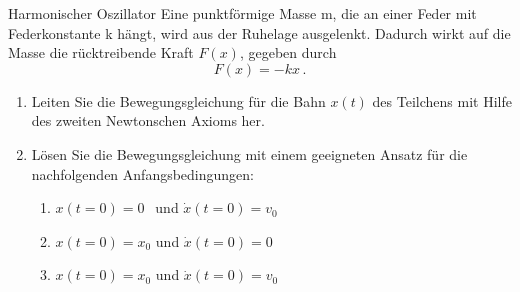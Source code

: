 \setcounter{punkte}{4}
\begin{aufgabe}{Harmonischer Oszillator}
Eine punktförmige Masse m, die an einer Feder mit Federkonstante k
hängt, wird aus der Ruhelage ausgelenkt.
Dadurch wirkt auf die Masse die rücktreibende
Kraft $F(x)$, gegeben durch
\begin{equation}
  F(x) = -kx \, .
\end{equation}
\renewcommand{\labelenumi}{\alph{enumi})}
\renewcommand{\labelenumii}{(\roman{enumii})}
\begin{enumerate}
    \item Leiten Sie die Bewegungsgleichung für die Bahn $x(t)$ des Teilchens mit Hilfe des
    zweiten Newtonschen Axioms her.
    \item Lösen Sie die Bewegungsgleichung mit einem geeigneten Ansatz für die nachfolgenden
    Anfangsbedingungen:
    \begin{enumerate}
      \item $x(t=0) = 0$ $\: \:$und $\dot{x}(t=0) = v_0$
      \item $x(t=0) = x_0$ und $\dot{x}(t=0) = 0$
      \item $x(t=0) = x_0$ und $\dot{x}(t=0) = v_0$
    \end{enumerate}
\end{enumerate}
\end{aufgabe}

%
%
